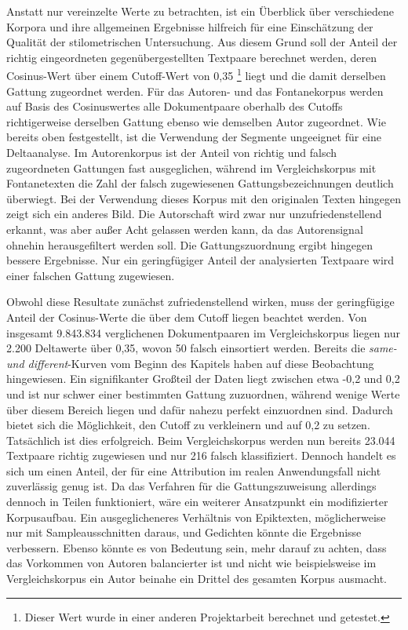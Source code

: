 \documentclass[a4paper,10p]{article}
\begin{document}
Anstatt nur vereinzelte Werte zu betrachten, ist ein Überblick über verschiedene Korpora und ihre allgemeinen Ergebnisse hilfreich für eine Einschätzung der Qualität der stilometrischen Untersuchung. Aus diesem Grund soll der Anteil der richtig eingeordneten gegenübergestellten Textpaare berechnet werden, deren Cosinus-Wert über einem Cutoff-Wert von 0,35 \footnote{Dieser Wert wurde in einer anderen Projektarbeit berechnet und getestet.} liegt und die damit derselben Gattung zugeordnet werden. Für das Autoren- und das Fontanekorpus werden auf Basis des Cosinuswertes alle Dokumentpaare oberhalb des Cutoffs richtigerweise derselben Gattung ebenso wie demselben Autor zugeordnet. Wie bereits oben festgestellt, ist die Verwendung der Segmente ungeeignet für eine Deltaanalyse. Im Autorenkorpus ist der Anteil von richtig und falsch zugeordneten Gattungen fast ausgeglichen, während im Vergleichskorpus mit Fontanetexten die Zahl der falsch zugewiesenen Gattungsbezeichnungen deutlich überwiegt. Bei der Verwendung dieses Korpus mit den originalen Texten hingegen zeigt sich ein anderes Bild. Die Autorschaft wird zwar nur unzufriedenstellend erkannt, was aber außer Acht gelassen werden kann, da das Autorensignal ohnehin herausgefiltert werden soll. Die Gattungszuordnung ergibt hingegen bessere Ergebnisse. Nur ein geringfügiger Anteil der analysierten Textpaare wird einer falschen Gattung zugewiesen. \par 

Obwohl diese Resultate zunächst zufriedenstellend wirken, muss der geringfügige Anteil der Cosinus-Werte die über dem Cutoff liegen beachtet werden. Von insgesamt 9.843.834 verglichenen Dokumentpaaren im Vergleichskorpus liegen nur 2.200 Deltawerte über 0,35, wovon 50 falsch einsortiert werden. Bereits die \textit{same- und different}-Kurven vom Beginn des Kapitels haben auf diese Beobachtung hingewiesen. Ein signifikanter Großteil der Daten liegt zwischen etwa -0,2 und 0,2 und ist nur schwer einer bestimmten Gattung zuzuordnen, während wenige Werte über diesem Bereich liegen und dafür nahezu perfekt einzuordnen sind. Dadurch bietet sich die Möglichkeit, den Cutoff zu verkleinern und auf 0,2 zu setzen. Tatsächlich ist dies erfolgreich. Beim Vergleichskorpus werden nun bereits 23.044 Textpaare richtig zugewiesen und nur 216 falsch klassifiziert. Dennoch handelt es sich um einen Anteil, der für eine Attribution im realen Anwendungsfall nicht zuverlässig genug ist. Da das Verfahren für die Gattungszuweisung allerdings dennoch in Teilen funktioniert, wäre ein weiterer Ansatzpunkt ein modifizierter Korpusaufbau. Ein ausgeglicheneres Verhältnis von Epiktexten, möglicherweise nur mit Sampleausschnitten daraus, und Gedichten könnte die Ergebnisse verbessern. Ebenso könnte es von Bedeutung sein, mehr darauf zu achten, dass das Vorkommen von Autoren balancierter ist und nicht wie beispielsweise im Vergleichskorpus ein Autor beinahe ein Drittel des gesamten Korpus ausmacht.
\end{document}
